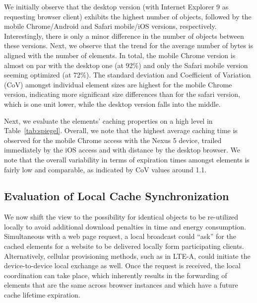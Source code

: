 \documentclass[letterpaper,conference]{IEEEtran}
\begin{document}
We initially observe that the desktop version (with Internet Explorer 9 as requesting browser client) exhibits the highest number of objects, followed by the mobile Chrome/Android and Safari mobile/iOS versions, respectively. 
Interestingly, there is only a minor difference in the number of objects between these versions.
Next, we observe that the trend for the average number of bytes is aligned with the number of elements. 
In total, the mobile Chrome version is almost on par with the desktop one (at 92\%) and only the Safari mobile version seeming optimized (at 72\%).
The standard deviation and Coefficient of Variation (CoV) amongst individual element sizes are highest for the mobile Chrome version, indicating more significant size differences than for the safari version, which is one unit lower, while the desktop version falls into the middle.

Next, we evaluate the elements' caching properties on a high level in Table~\ref{tab:spiegel}. 
Overall, we note that the highest average caching time is observed for the mobile Chrome access with the Nexus 5 device, trailed immediately by the iOS access and with distance by the desktop browser.
We note that the overall variability in terms of expiration times amongst elements is fairly low and comparable, as indicated by CoV values around 1.1.

\subsection{Evaluation of Local Cache Synchronization}
We now shift the view to the possibility for identical objects to be re-utilized locally to avoid additional download penalties in time and energy consumption.
Simultaneous with a web page request, a local broadcast could ``ask'' for the cached elements for a website to be delivered locally form participating clients. Alternatively, cellular provisioning methods, such as in LTE-A, could initiate the device-to-device local exchange as well.
Once the request is received, the local coordination can take place, which inherently results in the forwarding of elements that are the same across browser instances and which have a future cache lifetime expiration.
\end{document}
